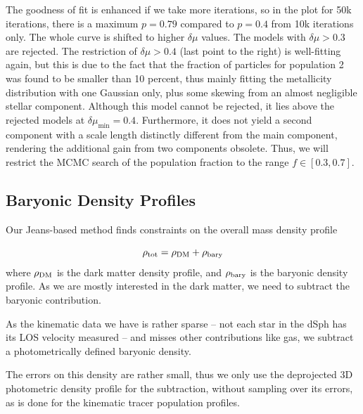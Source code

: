 The goodness of fit is enhanced if we take more iterations, so in the
plot for 50k iterations, there is a maximum $p=0.79$ compared to
$p=0.4$ from 10k iterations only. The whole curve is shifted to higher
$\delta \mu$ values. The models with $\delta \mu>0.3$ are
rejected. The restriction of $\delta \mu>0.4$ (last point to the
right) is well-fitting again, but this is due to the fact that the
fraction of particles for population 2 was found to be smaller than 10
percent, thus mainly fitting the metallicity distribution with one
Gaussian only, plus some skewing from an almost negligible stellar
component. Although this model cannot be rejected, it lies above the
rejected models at $\delta\mu_{\min}=0.4$. Furthermore, it does not
yield a second component with a scale length distinctly different from
the main component, rendering the additional gain from two components
obsolete. Thus, we will restrict the MCMC search of the population
fraction to the range $f\in[0.3,0.7]$.

\subsection{Baryonic Density Profiles}
Our Jeans-based method finds constraints on the overall mass density
profile

\begin{equation}
  \rho_{\rm tot} = \rho_{\rm DM}+\rho_{\rm bary}
\end{equation}
where $\rho_{\rm DM}$ is the dark matter density profile, and
$\rho_{\rm bary}$ is the baryonic density profile. As we are mostly
interested in the dark matter, we need to subtract the baryonic
contribution.

As the kinematic data we have is rather sparse -- not each star in the
dSph has its LOS velocity measured -- and misses other contributions
like gas, we subtract a photometrically defined baryonic density.

The errors on this density are rather small, thus we only use the
deprojected 3D photometric density profile for the subtraction,
without sampling over its errors, as is done for the kinematic tracer
population profiles.



